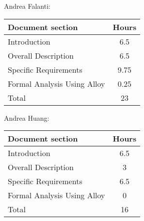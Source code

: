 Andrea Falanti:

\begin{tabular}{|l|c|}
    \hline
    Document section & Hours \\
    \hline
     Introduction & 6.5\\
     Overall Description & 6.5\\
     Specific Requirements & 9.75\\
     Formal Analysis Using Alloy & 0.25\\
     \hline
     Total & 23\\
     \hline
\end{tabular}
\vskip 0.3in

Andrea Huang:

\begin{tabular}{|l|c|}
    \hline
    Document section & Hours \\
    \hline
     Introduction &  6.5\\
     Overall Description & 3\\
     Specific Requirements & 6.5\\
     Formal Analysis Using Alloy & 0\\
     \hline
     Total & 16\\
     \hline
\end{tabular}